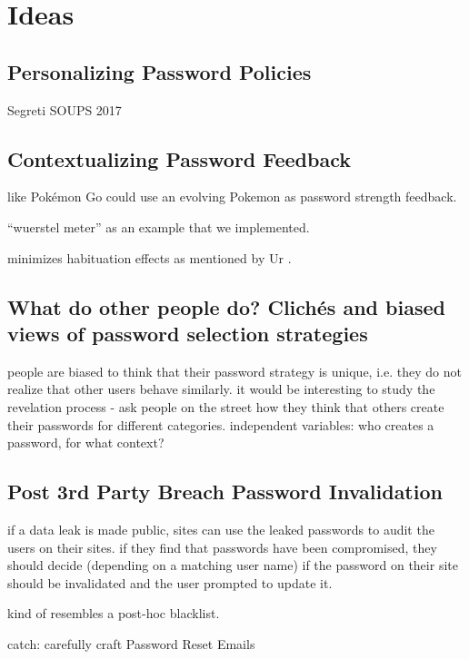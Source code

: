 \chapter[Ideas for Holistic Password Support]{Ideas}\label{chap:pst:ideas}

\section{Personalizing Password Policies}\label{sec:pst:personalizing-policies}

Segreti \etal SOUPS 2017
\cite{Seitz2017PPT}
\cite{Segreti2017AdaptivePolicies}

\section{Contextualizing Password Feedback}
like \cite{Kroeze2012GamifyingAuthentication} Pokémon Go could use an evolving Pokemon as password strength feedback. 

``wuerstel meter'' as an example that we implemented.

minimizes habituation effects as mentioned by Ur \etal \cite{Ur2012HelpingUsersCreateBetterPasswords}.

\section{What do other people do? Clichés and biased views of password selection strategies}
people are biased to think that their password strategy is unique, i.e. they do not realize that other users behave similarly. it would be interesting to study the revelation process - ask people on the street how they think that others create their passwords for different categories. independent variables: who creates a password, for what context?

\section{Post 3rd Party Breach Password Invalidation}
if a data leak is made public, sites can use the leaked passwords to audit the users on their sites. if they find that passwords have been compromised, they should decide (depending on a matching user name) if the password on their site should be invalidated and the user prompted to update it.

kind of resembles a post-hoc blacklist.  

catch: carefully craft Password Reset Emails \cite{Kim2017TooBusy}

